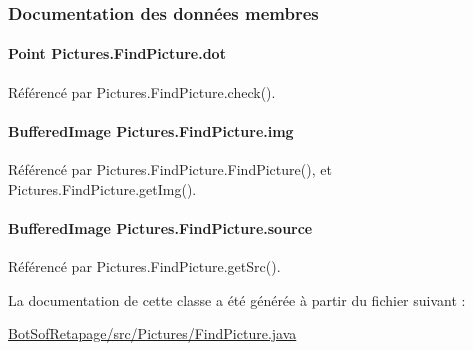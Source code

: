 \subsubsection{Documentation des données membres}
\hypertarget{classPictures_1_1FindPicture_aa3ea544e21a97744534e323e3229899b}{}
\paragraph[{dot}]{\setlength{\rightskip}{0pt plus 5cm}Point Pictures.\+Find\+Picture.\+dot}\label{classPictures_1_1FindPicture_aa3ea544e21a97744534e323e3229899b}


Référencé par Pictures.\+Find\+Picture.\+check().

\hypertarget{classPictures_1_1FindPicture_aae63a27df999ed48e5af4c680c3d75ad}{}
\paragraph[{img}]{\setlength{\rightskip}{0pt plus 5cm}Buffered\+Image Pictures.\+Find\+Picture.\+img\hspace{0.3cm}{\ttfamily [package]}}\label{classPictures_1_1FindPicture_aae63a27df999ed48e5af4c680c3d75ad}


Référencé par Pictures.\+Find\+Picture.\+Find\+Picture(), et Pictures.\+Find\+Picture.\+get\+Img().

\hypertarget{classPictures_1_1FindPicture_a97e21e6354d181ae52c8b33ff3968128}{}
\paragraph[{source}]{\setlength{\rightskip}{0pt plus 5cm}Buffered\+Image Pictures.\+Find\+Picture.\+source}\label{classPictures_1_1FindPicture_a97e21e6354d181ae52c8b33ff3968128}


Référencé par Pictures.\+Find\+Picture.\+get\+Src().



La documentation de cette classe a été générée à partir du fichier suivant \+:\begin{DoxyCompactItemize}
\item 
\hyperlink{BotSofRetapage_2src_2Pictures_2FindPicture_8java}{Bot\+Sof\+Retapage/src/\+Pictures/\+Find\+Picture.\+java}\end{DoxyCompactItemize}
